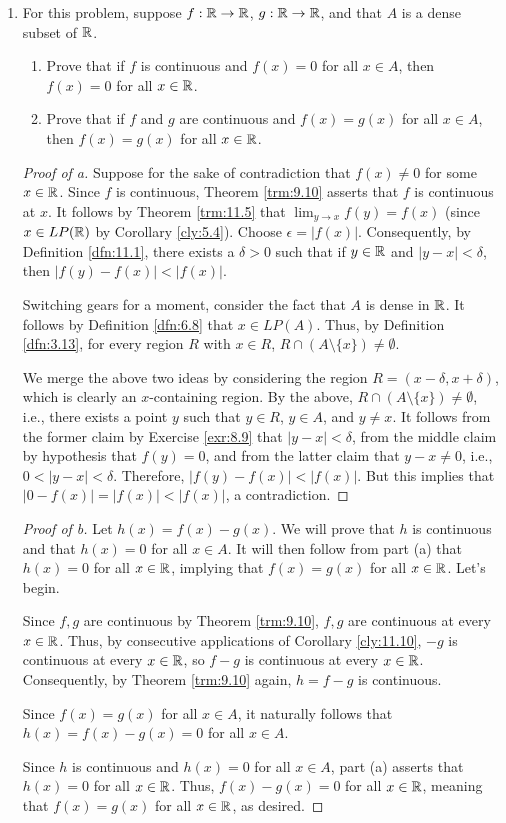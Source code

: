 \documentclass[../main.tex]{subfiles}
\begin{document}
\begin{enumerate}
\begin{proof}[Proof of d]
    \end{proof}
    \item For this problem, suppose $f:\mathbb{R}\to\mathbb{R}$, $g:\mathbb{R}\to\mathbb{R}$, and that $A$ is a dense subset of $\mathbb{R}$.
    \begin{enumerate}
        \item Prove that if $f$ is continuous and $f(x)=0$ for all $x\in A$, then $f(x)=0$ for all $x\in\mathbb{R}$.
        \item Prove that if $f$ and $g$ are continuous and $f(x)=g(x)$ for all $x\in A$, then $f(x)=g(x)$ for all $x\in\mathbb{R}$.
    \end{enumerate}
    \begin{proof}[Proof of a]
        Suppose for the sake of contradiction that $f(x)\neq 0$ for some $x\in\mathbb{R}$. Since $f$ is continuous, Theorem \ref{trm:9.10} asserts that $f$ is continuous at $x$. It follows by Theorem \ref{trm:11.5} that $\lim_{y\to x}f(y)=f(x)$ (since $x\in LP(\mathbb{R})$ by Corollary \ref{cly:5.4}). Choose $\epsilon=|f(x)|$. Consequently, by Definition \ref{dfn:11.1}, there exists a $\delta>0$ such that if $y\in\mathbb{R}$ and $|y-x|<\delta$, then $|f(y)-f(x)|<|f(x)|$.\par
        Switching gears for a moment, consider the fact that $A$ is dense in $\mathbb{R}$. It follows by Definition \ref{dfn:6.8} that $x\in LP(A)$. Thus, by Definition \ref{dfn:3.13}, for every region $R$ with $x\in R$, $R\cap(A\setminus\{x\})\neq\emptyset$.\par
        We merge the above two ideas by considering the region $R=(x-\delta,x+\delta)$, which is clearly an $x$-containing region. By the above, $R\cap(A\setminus\{x\})\neq\emptyset$, i.e., there exists a point $y$ such that $y\in R$, $y\in A$, and $y\neq x$. It follows from the former claim by Exercise \ref{exr:8.9} that $|y-x|<\delta$, from the middle claim by hypothesis that $f(y)=0$, and from the latter claim that $y-x\neq 0$, i.e., $0<|y-x|<\delta$. Therefore, $|f(y)-f(x)|<|f(x)|$. But this implies that $|0-f(x)|=|f(x)|<|f(x)|$, a contradiction.
    \end{proof}
    \begin{proof}[Proof of b]
        Let $h(x)=f(x)-g(x)$. We will prove that $h$ is continuous and that $h(x)=0$ for all $x\in A$. It will then follow from part (a) that $h(x)=0$ for all $x\in\mathbb{R}$, implying that $f(x)=g(x)$ for all $x\in\mathbb{R}$. Let's begin.\par
        Since $f,g$ are continuous by Theorem \ref{trm:9.10}, $f,g$ are continuous at every $x\in\mathbb{R}$. Thus, by consecutive applications of Corollary \ref{cly:11.10}, $-g$ is continuous at every $x\in\mathbb{R}$, so $f-g$ is continuous at every $x\in\mathbb{R}$. Consequently, by Theorem \ref{trm:9.10} again, $h=f-g$ is continuous.\par
        Since $f(x)=g(x)$ for all $x\in A$, it naturally follows that $h(x)=f(x)-g(x)=0$ for all $x\in A$.\par
        Since $h$ is continuous and $h(x)=0$ for all $x\in A$, part (a) asserts that $h(x)=0$ for all $x\in\mathbb{R}$. Thus, $f(x)-g(x)=0$ for all $x\in\mathbb{R}$, meaning that $f(x)=g(x)$ for all $x\in\mathbb{R}$, as desired.
    \end{proof}
\end{enumerate}
\end{document}
